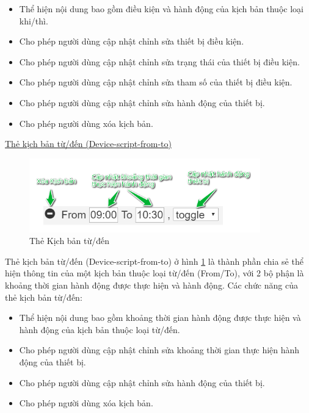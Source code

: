\documentclass[12pt,a4paper,oneside]{extbook}
\begin{document}
\begin{itemize}[topsep=1mm,itemsep=-0.5mm]
\item Thể hiện nội dung bao gồm điều kiện và hành động của kịch bản thuộc loại khi/thì.
\item Cho phép người dùng cập nhật chỉnh sửa thiết bị điều kiện.
\item Cho phép người dùng cập nhật chỉnh sửa trạng thái của thiết bị điều kiện.
\item Cho phép người dùng cập nhật chỉnh sửa tham số của thiết bị điều kiện.
\item Cho phép người dùng cập nhật chỉnh sửa hành động của thiết bị.
\item Cho phép người dùng xóa kịch bản.
\vspace{1mm}
\end{itemize}

\noindent
\underline{Thẻ kịch bản từ/đến (Device-script-from-to)}

\begin{figure}[h]
  \centering
     \includegraphics[width=10cm]{6-device-script-from-to}
  \caption{Thẻ Kịch bản từ/đến}\label{fig:6-device-script-from-to}
\end{figure}

\noindent
Thẻ kịch bản từ/đến (Device-script-from-to) ở hình \ref{fig:6-device-script-from-to} là thành phần chia sẻ thể hiện thông tin của một kịch bản thuộc loại từ/đến (From/To), với 2 bộ phận là khoảng thời gian hành động được thực hiện và hành động. Các chức năng của thẻ kịch bản từ/đến:

\begin{itemize}[topsep=1mm,itemsep=-0.5mm]
\item Thể hiện nội dung bao gồm khoảng thời gian hành động được thực hiện và hành động của kịch bản thuộc loại từ/đến.
\item Cho phép người dùng cập nhật chỉnh sửa khoảng thời gian thực hiện hành động của thiết bị.
\item Cho phép người dùng cập nhật chỉnh sửa hành động của thiết bị.
\item Cho phép người dùng xóa kịch bản.
\vspace{1mm}
\end{itemize}
\end{document}
